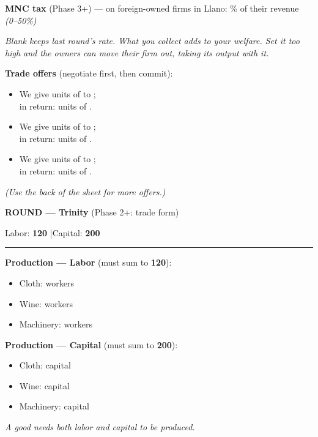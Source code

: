 \documentclass[11pt]{article}
\newcommand{\blank}[1]{\underline{\hspace{#1}}}
\newcommand{\hr}{\par\vspace{2pt}\noindent\rule{\linewidth}{0.4pt}\par\vspace{2pt}}
\begin{document}
\vspace{4pt}
{\bfseries MNC tax} (Phase 3+) --- on foreign-owned firms in Llano: \blank{1.4cm}\% of their revenue \quad \textit{(0--50\%)}\par
\textit{Blank keeps last round's rate. What you collect adds to your welfare. Set it too high and the owners can move their firm out, taking its output with it.}

\vspace{4pt}
{\bfseries Trade offers} (negotiate first, then commit):\par
\begin{itemize}[itemsep=4pt,leftmargin=1.4em]
  \item We give \blank{1.8cm} units of \blank{2.2cm} to \blank{2.2cm};\\[2pt] in return: \blank{1.8cm} units of \blank{2.2cm}.
  \item We give \blank{1.8cm} units of \blank{2.2cm} to \blank{2.2cm};\\[2pt] in return: \blank{1.8cm} units of \blank{2.2cm}.
  \item We give \blank{1.8cm} units of \blank{2.2cm} to \blank{2.2cm};\\[2pt] in return: \blank{1.8cm} units of \blank{2.2cm}.
\end{itemize}
\textit{(Use the back of the sheet for more offers.)}

\newpage

{\large\bfseries ROUND \blank{1cm} --- Trinity} \hfill (Phase 2+: trade form)\par
Labor: \textbf{120} \quad|\quad Capital: \textbf{200}
\hr

{\bfseries Production --- Labor} (must sum to \textbf{120}):\par
\begin{itemize}[nosep,leftmargin=1.4em]
  \item Cloth: \blank{2.5cm} workers
  \item Wine: \blank{2.5cm} workers
  \item Machinery: \blank{2.5cm} workers
\end{itemize}

{\bfseries Production --- Capital} (must sum to \textbf{200}):\par
\begin{itemize}[nosep,leftmargin=1.4em]
  \item Cloth: \blank{2.5cm} capital
  \item Wine: \blank{2.5cm} capital
  \item Machinery: \blank{2.5cm} capital
\end{itemize}
\textit{A good needs \emph{both} labor and capital to be produced.}
\end{document}
